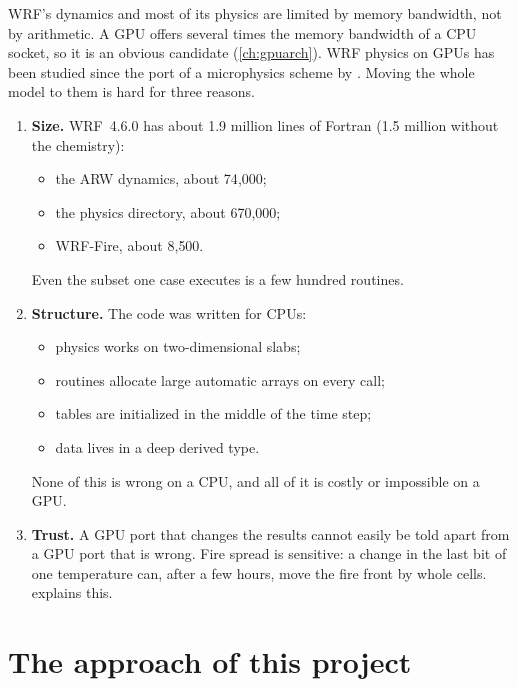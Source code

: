 WRF's dynamics and most of its physics are limited by memory bandwidth, not by arithmetic. A GPU offers several times
the memory bandwidth of a CPU socket, so it is an obvious candidate (\cref{ch:gpuarch}). WRF physics on GPUs has been
studied since the port of a microphysics scheme by \citet{michalakes2008}. Moving the whole model to them is hard for
three reasons.
\begin{enumerate}
  \item \textbf{Size.} WRF~4.6.0 has about 1.9 million lines of Fortran (1.5 million without the chemistry):
    \begin{itemize}
      \item the ARW dynamics, about 74{,}000;
      \item the physics directory, about 670{,}000;
      \item WRF-Fire, about 8{,}500.
    \end{itemize}
    Even the subset one case executes is a few hundred routines.
  \item \textbf{Structure.} The code was written for CPUs:
    \begin{itemize}
      \item physics works on two-dimensional slabs;
      \item routines allocate large automatic arrays on every call;
      \item tables are initialized in the middle of the time step;
      \item data lives in a deep derived type.
    \end{itemize}
    None of this is wrong on a CPU, and all of it is costly or impossible on a GPU.
  \item \textbf{Trust.} A GPU port that changes the results cannot easily be told apart from a GPU port that is
    wrong. Fire spread is sensitive: a change in the last bit of one temperature can, after a few hours, move the fire
    front by whole cells.  explains this.
\end{enumerate}

\section{The approach of this project}

